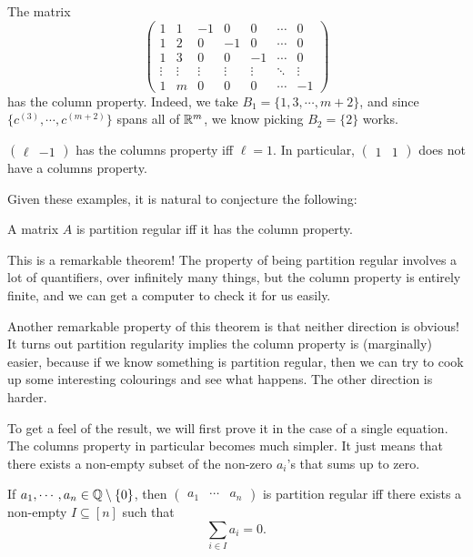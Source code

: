 \documentclass[a4paper]{article}
\begin{document}
  \begin{eg}
    The matrix
    \[
      \begin{pmatrix}
        1 & 1 & -1 & 0 & 0 & \cdots & 0\\
        1 & 2 & 0 & -1 & 0 & \cdots & 0\\
        1 & 3 & 0 & 0 & -1 & \cdots & 0\\
        \vdots & \vdots & \vdots & \vdots & \vdots & \ddots & \vdots\\
        1 & m & 0 & 0 & 0 & \cdots & -1
      \end{pmatrix}
    \]
    has the column property. Indeed, we take $B_1 = \{1, 3, \cdots, m + 2\}$, and since $\{c^{(3)}, \cdots, c^{(m + 2)}\}$ spans all of $\mathbb{R}^m$, we know picking $B_2 = \{2\}$ works.
  \end{eg}

  \begin{eg}
    $\begin{pmatrix}\ell & -1\end{pmatrix}$ has the columns property iff $\ell = 1$. In particular, $\begin{pmatrix}1 & 1 \end{pmatrix}$ does not have a columns property.
  \end{eg}

  Given these examples, it is natural to conjecture the following:
  \begin{thm}
    A matrix $A$ is partition regular iff it has the column property.
  \end{thm}
  This is a remarkable theorem! The property of being partition regular involves a lot of quantifiers, over infinitely many things, but the column property is entirely finite, and we can get a computer to check it for us easily.

  Another remarkable property of this theorem is that neither direction is obvious! It turns out partition regularity implies the column property is (marginally) easier, because if we know something is partition regular, then we can try to cook up some interesting colourings and see what happens. The other direction is harder.

  To get a feel of the result, we will first prove it in the case of a single equation. The columns property in particular becomes much simpler. It just means that there exists a non-empty subset of the non-zero $a_i$'s that sums up to zero.

  \begin{thm}
    If $a_1,\cdots, a_n \in \mathbb{Q} \setminus \{0\}$, then $\begin{pmatrix} a_1 & \cdots & a_n \end{pmatrix}$ is partition regular iff there exists a non-empty $I \subseteq [n]$ such that
    \[
      \sum_{i \in I} a_i = 0.
    \]
  \end{thm}
\end{document}
